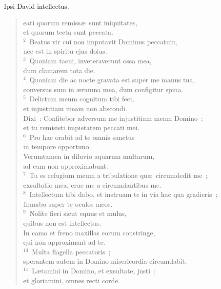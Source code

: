 \bchapter[Psalm]
Ipsi David intellectus. \begin{verse}eati quorum remiss\ae\ sunt iniquitates,\\ et quorum tecta sunt peccata.\\
${}^{2}$~Beatus vir cui non imputavit Dominus peccatum,\\ nec est in spiritu ejus dolus.\\
${}^{3}$~Quoniam tacui, inveteraverunt ossa mea,\\ dum clamarem tota die.\\
${}^{4}$~Quoniam die ac nocte gravata est super me manus tua,\\ conversus sum in \ae rumna mea, dum configitur spina.\\
${}^{5}$~Delictum meum cognitum tibi feci,\\ et injustitiam meam non abscondi.\\ Dixi~: Confitebor adversum me injustitiam meam Domino~;\\ et tu remisisti impietatem peccati mei.\\
${}^{6}$~Pro hac orabit ad te omnis sanctus\\ in tempore opportuno.\\ Verumtamen in diluvio aquarum multarum,\\ ad eum non approximabunt.\\
${}^{7}$~Tu es refugium meum a tribulatione qu\ae\ circumdedit me~;\\ exsultatio mea, erue me a circumdantibus me.\\
${}^{8}$~Intellectum tibi dabo, et instruam te in via hac qua gradieris~;\\ firmabo super te oculos meos.\\
${}^{9}$~Nolite fieri sicut equus et mulus,\\ quibus non est intellectus.\\ In camo et freno maxillas eorum constringe,\\ qui non approximant ad te.\\
${}^{10}$~Multa flagella peccatoris~;\\ sperantem autem in Domino misericordia circumdabit.\\
${}^{11}$~L\ae tamini in Domino, et exsultate, justi~;\\ et gloriamini, omnes recti corde.\end{verse}



